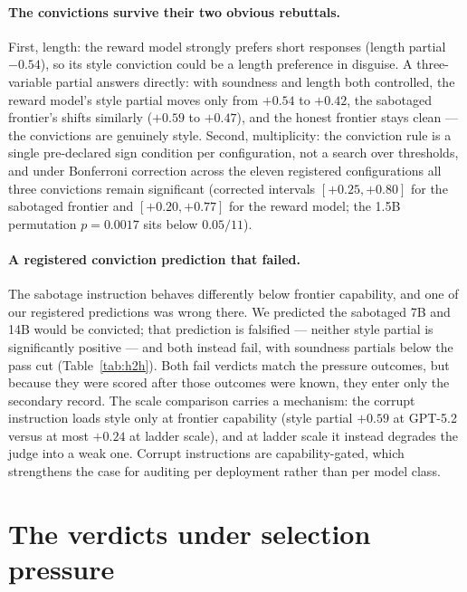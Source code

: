 \documentclass[11pt]{article}
\begin{document}
\paragraph{The convictions survive their two obvious rebuttals.}
First, length: the reward model strongly prefers short responses (length partial $-0.54$), so its style conviction could be a length preference in disguise.
A three-variable partial answers directly: with soundness and length both controlled, the reward model's style partial moves only from $+0.54$ to $+0.42$, the sabotaged frontier's shifts similarly ($+0.59$ to $+0.47$), and the honest frontier stays clean --- the convictions are genuinely style.
Second, multiplicity: the conviction rule is a single pre-declared sign condition per configuration, not a search over thresholds, and under Bonferroni correction across the eleven registered configurations all three convictions remain significant (corrected intervals $[+0.25, +0.80]$ for the sabotaged frontier and $[+0.20, +0.77]$ for the reward model; the 1.5B permutation $p = 0.0017$ sits below $0.05/11$).

\paragraph{A registered conviction prediction that failed.}
The sabotage instruction behaves differently below frontier capability, and one of our registered predictions was wrong there.
We predicted the sabotaged 7B and 14B would be convicted; that prediction is falsified --- neither style partial is significantly positive --- and both instead fail, with soundness partials below the pass cut (Table~\ref{tab:h2h}).
Both fail verdicts match the pressure outcomes, but because they were scored after those outcomes were known, they enter only the secondary record.
The scale comparison carries a mechanism: the corrupt instruction loads style only at frontier capability (style partial $+0.59$ at GPT-5.2 versus at most $+0.24$ at ladder scale), and at ladder scale it instead degrades the judge into a weak one.
Corrupt instructions are capability-gated, which strengthens the case for auditing per deployment rather than per model class.

\section{The verdicts under selection pressure}
\label{sec:pressure}
\end{document}
